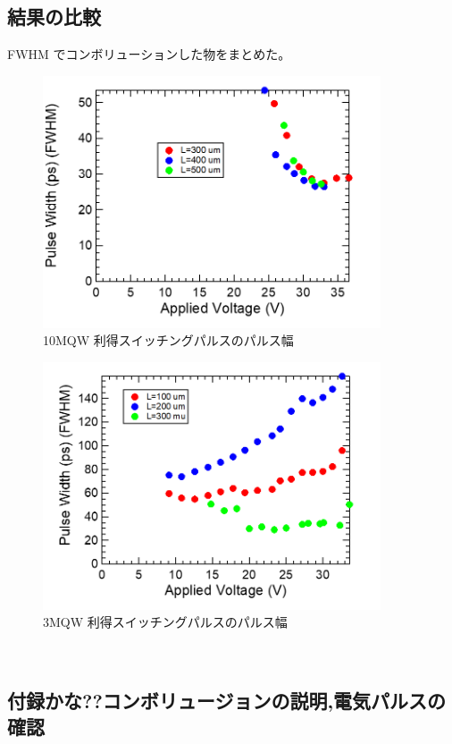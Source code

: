 \subsection{結果の比較}%
FWHM でコンボリューションした物をまとめた。
\begin{figure}[h]
	\centering
	\includegraphics[width=10cm]{figure/fig_3_2_10QW_ridge_GS_FWHM.png}
		\caption{10MQW 利得スイッチングパルスのパルス幅}
		\label{fig:fig_3_2_10QW_ridge_GS_FWHM}
\end{figure}

\begin{figure}[h]
	\centering
	\includegraphics[width=10cm]{figure/fig_3_2_3QW_ridge_GS_FWHM.png}
		\caption{3MQW 利得スイッチングパルスのパルス幅}
		\label{fig:fig_3_2_3QW_ridge_GS_FWHM}
\end{figure}
\newpage
　
\subsection{付録かな??コンボリュージョンの説明,電気パルスの確認}%

